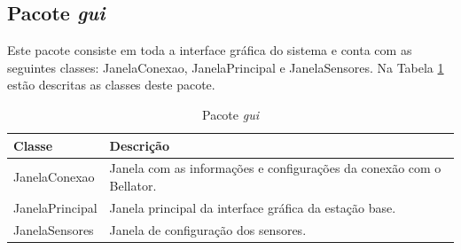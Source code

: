 \subsection{Pacote \textit{gui}}

Este pacote consiste em toda a interface gráfica do sistema e conta com as seguintes classes: JanelaConexao, JanelaPrincipal e JanelaSensores. Na Tabela \ref{tab:pacote_interface_grafica} estão descritas as classes deste pacote.

\begin{table}[h]
  \centering
  \caption{Pacote \textit{gui}}
  \begin{tabular}{p{6cm}p{8cm}}
    \toprule
    \textbf{Classe} & \textbf{Descrição} \\ 
    \midrule
    JanelaConexao & Janela com as informações e configurações da conexão com o Bellator. \\ \hline
    JanelaPrincipal & Janela principal da interface gráfica da estação base. \\ \hline
    JanelaSensores & Janela de configuração dos sensores. \\ 
    \bottomrule
  \end{tabular}%
  \label{tab:pacote_interface_grafica}%
\end{table}%

% 
% 

% 
% 


